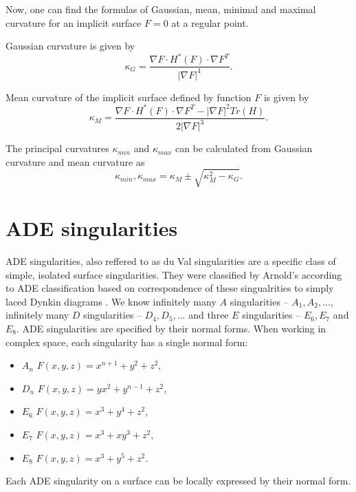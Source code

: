 Now, one can find the formulas of Gaussian, mean, minimal and maximal curvature
for an implicit surface $F=0$ at a regular point.

Gaussian curvature is given by 
$$\kappa_G = \frac{\nabla F \cdot H^*(F) \cdot \nabla F^T}{|\nabla F|^4}.$$

Mean curvature of the implicit surface defined by function $F$ is given by 
$$\kappa_M = \frac{\nabla F \cdot H^*(F) \cdot \nabla F^T - | \nabla F |^2 Tr(H)}{2|\nabla F|^3}.$$

The principal curvatures $\kappa_{min}$ and $\kappa_{max}$ can be calculated from Gaussian curvature and
mean curvature as 
$$\kappa_{min}, \kappa_{max} = \kappa_M \pm \sqrt{\kappa_M^2-\kappa_G}.$$

\section{ADE singularities}
\label{sub2.2}

ADE singularities, also reffered to as du Val singularities are a specific
class of simple, isolated surface singularities.
They were classified by Arnold's
\cite{arnol1972normal} according to ADE classification
\cite{hazewinkel1977ubiquity} based on
correspondence of these singualrities to simply laced Dynkin diagrams
\cite{dynkin1947structure}.
We know infinitely many $A$ singularities -- $A_1, A_2, ...$,
infinitely many $D$ singularities -- $D_4, D_5, ...$ and three $E$
singularities -- $E_6, E_7$ and $E_8$.
ADE singularities are specified by their normal forms.
When working in complex space, each singularity has a single normal form:
\begin{itemize}
    \item $A_n$ \hspace{5mm} $F(x,y,z)=x^{n+1}+y^2+z^2$,
    \item $D_n$ \hspace{5mm} $F(x,y,z)=yx^2+y^{n-1}+z^2$,
    \item $E_6$ \hspace{5mm} $F(x,y,z)=x^3+y^4+z^2$,
    \item $E_7$ \hspace{5mm} $F(x,y,z)=x^3+xy^3+z^2$,
    \item $E_8$ \hspace{5mm} $F(x,y,z)=x^3+y^5+z^2$.
\end{itemize}

Each ADE singularity on a surface can be locally expressed by their
normal form.


